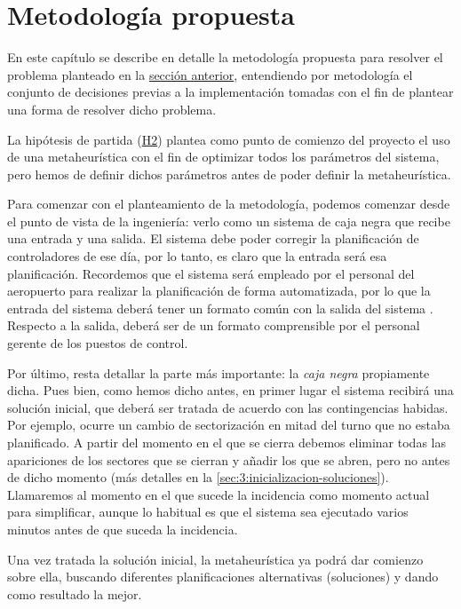\graphicspath{{capitulos/Capitulo3-Metodologia-propuesta/recursos/}}

\section{Metodología propuesta} \label{capitulo:3}
En este capítulo se describe en detalle la metodología propuesta para resolver el problema planteado en la \hyperref[capitulo:2]{sección anterior}, entendiendo por metodología el conjunto de decisiones previas a la implementación tomadas con el fin de plantear una forma de resolver dicho problema.

La hipótesis de partida (\hyperref[H2]{H2}) plantea como punto de comienzo del proyecto el uso de una metaheurística con el fin de optimizar todos los parámetros del sistema, pero hemos de definir dichos parámetros antes de poder definir la metaheurística.

Para comenzar con el planteamiento de la metodología, podemos comenzar desde el punto de vista de la ingeniería: verlo como un sistema de caja negra que recibe una entrada y una salida.
El sistema debe poder corregir la planificación de controladores de ese día, por lo tanto, es claro que la entrada será esa planificación. Recordemos que el sistema \legacy{} será empleado por el personal del aeropuerto para realizar la planificación de forma automatizada, por lo que la entrada del sistema deberá tener un formato común con la salida del sistema \legacy{}.
Respecto a la salida, deberá ser de un formato comprensible por el personal gerente de los puestos de control.

Por último, resta detallar la parte más importante: la \textit{caja negra} propiamente dicha. Pues bien, como hemos dicho antes, en primer lugar el sistema recibirá una solución inicial, que deberá ser tratada de acuerdo con las contingencias habidas. Por ejemplo, ocurre un cambio de sectorización en mitad del turno que no estaba planificado. 
A partir del momento en el que se cierra debemos eliminar todas las apariciones de los sectores que se cierran y añadir los que se abren, pero no antes de dicho momento (más detalles en la \autoref{sec:3:inicializacion-soluciones}). 
Llamaremos al momento en el que sucede la incidencia como momento actual para simplificar, aunque lo habitual es que el sistema sea ejecutado varios minutos antes de que suceda la incidencia.

Una vez tratada la solución inicial, la metaheurística ya podrá dar comienzo sobre ella, buscando diferentes 
planificaciones alternativas (soluciones) y dando como resultado la mejor. 


